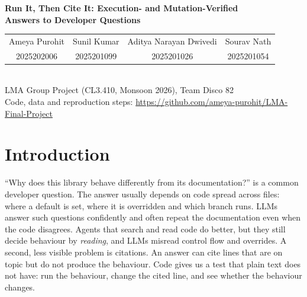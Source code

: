 \documentclass[10pt,a4paper]{article}
\newcommand{\code}[1]{\texttt{\small #1}}
\begin{document}
\begin{center}
{\LARGE\bfseries Run It, Then Cite It: Execution- and Mutation-Verified\\[2pt] Answers to Developer Questions}\\[6pt]
{\setlength{\tabcolsep}{9pt}\begin{tabular}{cccc}
\large Ameya Purohit & \large Sunil Kumar & \large Aditya Narayan Dwivedi & \large Sourav Nath\\
2025202006 & 2025201099 & 2025201026 & 2025201054
\end{tabular}}\\[3pt]
LMA Group Project (CL3.410, Monsoon 2026), Team Disco 82\\[2pt]
\small Code, data and reproduction steps: \url{https://github.com/ameya-purohit/LMA-Final-Project}
\end{center}

\begin{abstract}
\noindent Developers often ask how a library really behaves when its documentation may be wrong. LLM assistants tend
to repeat the documentation and cite code that looks related but does not decide the behaviour. We built an agent that
checks its own answer twice: it runs a small test program for each claim, and it keeps a cited code line only if
changing that line changes the test's result. We compared it with a ReAct agent that had the same tools, model and
budget, on 145 real GitHub issues from \code{click} and \code{marshmallow}, with answer keys built automatically from
each issue's merged fix. The hypotheses were pre-registered and the test set was locked before any test run. Our agent
did \textbf{not} win: 40.0\% of its answers were correct and correctly cited, against 49.7\% for ReAct by an LLM
judge, and 25.0\% against 41.7\% on 12 questions labelled by humans. The line-changing check was the main problem: it
rejected most of the lines that developers actually fixed. Both agents were far better than simple baselines, and no
system ran an unsafe action.
\end{abstract}

\section{Introduction}

``Why does this library behave differently from its documentation?'' is a common developer question. The answer
usually depends on code spread across files: where a default is set, where it is overridden and which branch runs.
LLMs answer such questions confidently and often repeat the documentation even when the code disagrees. Agents that
search and read code do better, but they still decide behaviour by \emph{reading}, and LLMs misread control flow and
overrides. A second, less visible problem is citations. An answer can cite lines that are on topic but do not
produce the behaviour. Code gives us a test that plain text does not have: run the behaviour, change the cited line,
and see whether the behaviour changes.
\end{document}
